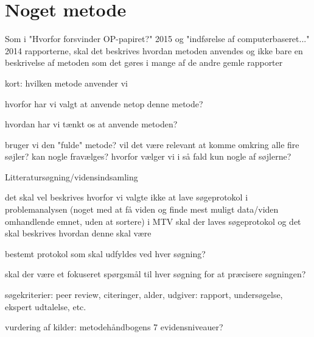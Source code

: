 \section{Noget metode}

Som i "Hvorfor forsvinder OP-papiret?" 2015 og "indførelse af computerbaseret..." 2014 rapporterne, skal det beskrives hvordan metoden anvendes og ikke bare en beskrivelse af metoden som det gøres i mange af de andre gemle rapporter

\item kort: hvilken metode anvender vi
\item hvorfor har vi valgt at anvende netop denne metode?
\item hvordan har vi tænkt os at anvende metoden?
\item bruger vi den "fulde" metode? vil det være relevant at komme omkring alle fire søjler? kan nogle fravælges? hvorfor vælger vi i så fald kun nogle af søjlerne? 


Litteratursøgning/vidensindsamling

det skal vel beskrives hvorfor vi valgte ikke at lave søgeprotokol i problemanalysen (noget med at få viden og finde mest muligt data/viden omhandlende emnet, uden at sortere) 
i MTV skal der laves søgeprotokol og det skal beskrives hvordan denne skal være
\item bestemt protokol som skal udfyldes ved hver søgning?
\item skal der være et fokuseret spørgsmål til hver søgning for at præcisere søgningen?
\item søgekriterier: peer review, citeringer, alder, udgiver: rapport, undersøgelse, ekspert udtalelse, etc. 
\item vurdering af kilder: metodehåndbogens 7 evidensniveauer?
